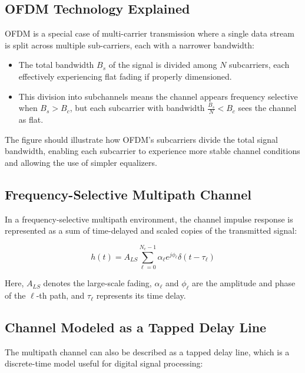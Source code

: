 \subsection*{OFDM Technology Explained}

OFDM is a special case of multi-carrier transmission where a single data stream is split across multiple sub-carriers, each with a narrower bandwidth:

\begin{itemize}
    \item The total bandwidth \( B_s \) of the signal is divided among \( N \) subcarriers, each effectively experiencing flat fading if properly dimensioned.
    \item This division into subchannels means the channel appears frequency selective when \( B_s > B_c \), but each subcarrier with bandwidth \( \frac{B_s}{N} < B_c \) sees the channel as flat.
\end{itemize}

The figure should illustrate how OFDM's subcarriers divide the total signal bandwidth, enabling each subcarrier to experience more stable channel conditions and allowing the use of simpler equalizers.

\subsection*{Frequency-Selective Multipath Channel}

In a frequency-selective multipath environment, the channel impulse response is represented as a sum of time-delayed and scaled copies of the transmitted signal:

\begin{equation}
    h(t) = A_{LS} \sum_{\ell=0}^{N_c-1} \alpha_{\ell} e^{j\phi_{\ell}} \delta(t - \tau_{\ell})
\end{equation}

Here, \( A_{LS} \) denotes the large-scale fading, \( \alpha_{\ell} \) and \( \phi_{\ell} \) are the amplitude and phase of the \(\ell\)-th path, and \( \tau_{\ell} \) represents its time delay.

\subsection*{Channel Modeled as a Tapped Delay Line}

The multipath channel can also be described as a tapped delay line, which is a discrete-time model useful for digital signal processing:

